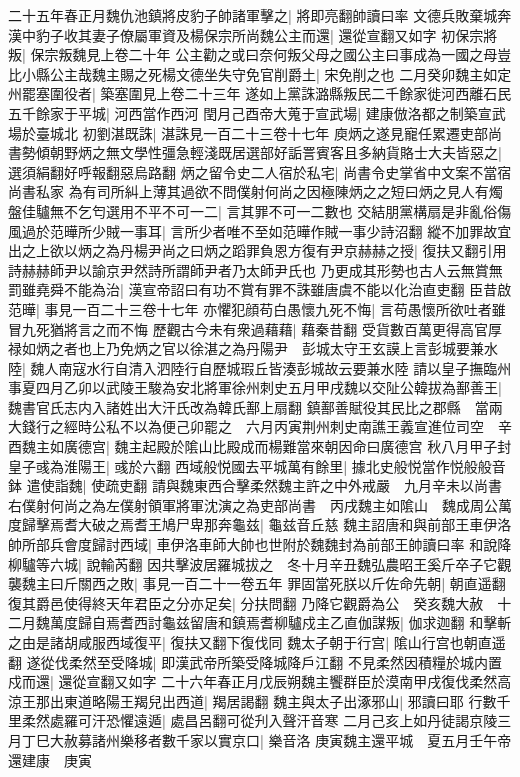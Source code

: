 二十五年春正月魏仇池鎮將皮豹子帥諸軍擊之|{
	將即亮翻帥讀曰率}
文德兵敗棄城奔漢中豹子收其妻子僚屬軍資及楊保宗所尚魏公主而還|{
	還從宣翻又如字}
初保宗將叛|{
	保宗叛魏見上卷二十年}
公主勸之或曰奈何叛父母之國公主曰事成為一國之母豈比小縣公主哉魏主賜之死楊文德坐失守免官削爵土|{
	宋免削之也}
二月癸卯魏主如定州罷塞圍役者|{
	築塞圍見上卷二十三年}
遂如上黨誅潞縣叛民二千餘家徙河西離石民五千餘家于平城|{
	河西當作西河}
閏月己酉帝大蒐于宣武場|{
	建康倣洛都之制築宣武場於臺城北}
初劉湛既誅|{
	湛誅見一百二十三卷十七年}
庾炳之遂見寵任累遷吏部尚書勢傾朝野炳之無文學性彊急輕淺既居選部好詬詈賓客且多納貨賂士大夫皆惡之|{
	選須絹翻好呼報翻惡烏路翻}
炳之留令史二人宿於私宅|{
	尚書令史掌省中文案不當宿尚書私家}
為有司所糾上薄其過欲不問僕射何尚之因極陳炳之之短曰炳之見人有燭盤佳驢無不乞匄選用不平不可一二|{
	言其罪不可一二數也}
交結朋黨構扇是非亂俗傷風過於范曄所少賊一事耳|{
	言所少者唯不至如范曄作賊一事少詩沼翻}
縱不加罪故宜出之上欲以炳之為丹楊尹尚之曰炳之蹈罪負恩方復有尹京赫赫之授|{
	復扶又翻引用詩赫赫師尹以諭京尹然詩所謂師尹者乃太師尹氏也}
乃更成其形勢也古人云無賞無罰雖堯舜不能為治|{
	漢宣帝詔曰有功不賞有罪不誅雖唐虞不能以化治直吏翻}
臣昔啟范曄|{
	事見一百二十三卷十七年}
亦懼犯顔苟白愚懷九死不悔|{
	言苟愚懷所欲吐者雖冒九死猶將言之而不悔}
歷觀古今未有衆過藉藉|{
	藉秦昔翻}
受貨數百萬更得高官厚禄如炳之者也上乃免炳之官以徐湛之為丹陽尹　彭城太守王玄謨上言彭城要兼水陸|{
	魏人南寇水行自清入泗陸行自歷城瑕丘皆湊彭城故云要兼水陸}
請以皇子撫臨州事夏四月乙卯以武陵王駿為安北將軍徐州刺史五月甲戌魏以交阯公韓拔為鄯善王|{
	魏書官氏志内入諸姓出大汗氏改為韓氏鄯上扇翻}
鎮鄯善賦役其民比之郡縣　當兩大錢行之經時公私不以為便己卯罷之　六月丙寅荆州刺史南譙王義宣進位司空　辛酉魏主如廣德宫|{
	魏主起殿於隂山比殿成而楊難當來朝因命曰廣德宫}
秋八月甲子封皇子彧為淮陽王|{
	彧於六翻}
西域般悦國去平城萬有餘里|{
	據北史般悦當作悦般般音鉢}
遣使詣魏|{
	使疏吏翻}
請與魏東西合擊柔然魏主許之中外戒嚴　九月辛未以尚書右僕射何尚之為左僕射領軍將軍沈演之為吏部尚書　丙戌魏主如隂山　魏成周公萬度歸擊焉耆大破之焉耆王鳩尸卑那奔龜兹|{
	龜兹音丘慈}
魏主詔唐和與前部王車伊洛帥所部兵會度歸討西域|{
	車伊洛車師大帥也世附於魏魏封為前部王帥讀曰率}
和說降柳驢等六城|{
	說輸芮翻}
因共擊波居羅城拔之　冬十月辛丑魏弘農昭王奚斤卒子它觀襲魏主曰斤關西之敗|{
	事見一百二十一卷五年}
罪固當死朕以斤佐命先朝|{
	朝直遥翻}
復其爵邑使得終天年君臣之分亦足矣|{
	分扶問翻}
乃降它觀爵為公　癸亥魏大赦　十二月魏萬度歸自焉耆西討龜兹留唐和鎮焉耆柳驢戍主乙直伽謀叛|{
	伽求迦翻}
和擊斬之由是諸胡咸服西域復平|{
	復扶又翻下復伐同}
魏太子朝于行宫|{
	隂山行宫也朝直遥翻}
遂從伐柔然至受降城|{
	即漢武帝所築受降城降戶江翻}
不見柔然因積糧於城内置戍而還|{
	還從宣翻又如字}
二十六年春正月戊辰朔魏主饗群臣於漠南甲戌復伐柔然高涼王那出東道略陽王羯兒出西道|{
	羯居謁翻}
魏主與太子出涿邪山|{
	邪讀曰耶}
行數千里柔然處羅可汗恐懼遠遁|{
	處昌呂翻可從刋入聲汗音寒}
二月己亥上如丹徒謁京陵三月丁巳大赦募諸州樂移者數千家以實京口|{
	樂音洛}
庚寅魏主還平城　夏五月壬午帝還建康　庚寅

